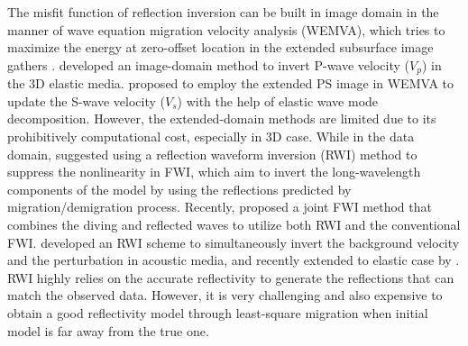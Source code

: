 \documentclass[extra,mreferee]{gji}
\begin{document}
The misfit function of reflection inversion can be built in image domain in the manner of wave equation migration
velocity analysis (WEMVA), which tries to maximize the
energy at zero-offset location in the extended subsurface image gathers
\cite[]{Symes2008,Almomin2012,SunEtAl2012,biondi2013}.
\cite{RaknesEtAl2016}
developed an image-domain method to invert P-wave velocity ($V_p$) in the 3D elastic media.
\cite{Wang2017WEMVA} proposed to employ the extended PS image in WEMVA to update the
S-wave velocity ($V_s$) with the help of elastic wave mode decomposition.
However, the extended-domain methods are limited due to its prohibitively computational cost,
especially in 3D case.
While in the data domain,
\cite{xu:2012} suggested using a reflection waveform inversion (RWI) method to suppress the
nonlinearity in FWI,
which aim to invert the long-wavelength components of the model by using the reflections
predicted by migration/demigration process.
Recently, \cite{Zhou2015} proposed a joint FWI method that combines the diving and reflected waves to
utilize both RWI and the conventional FWI.
\cite{Wu2015b} developed an RWI scheme to simultaneously invert the background velocity and the
perturbation in acoustic media,  and recently extended to elastic case by
\cite{Guo2016}.
RWI highly relies on the accurate reflectivity to generate the reflections that can match the
observed data. However, it is very challenging and also expensive to obtain a good reflectivity model through
least-square migration when initial model is far away from the true one.
\end{document}
